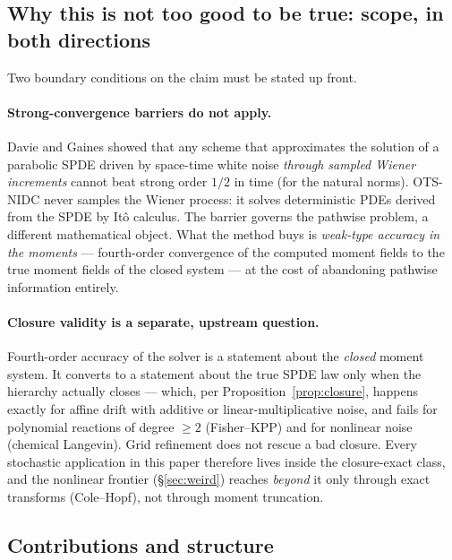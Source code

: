 \subsection{Why this is not too good to be true: scope, in both directions}

Two boundary conditions on the claim must be stated up front.

\paragraph{Strong-convergence barriers do not apply.} Davie and Gaines
\citep{davie2001} showed that any scheme that approximates the solution of a
parabolic SPDE driven by space-time white noise \emph{through sampled Wiener
increments} cannot beat strong order $1/2$ in time (for the natural norms).
OTS-NIDC never samples the Wiener process: it solves deterministic PDEs derived
from the SPDE by It\^o calculus. The barrier governs the pathwise problem, a
different mathematical object. What the method buys is \emph{weak-type accuracy in
the moments} --- fourth-order convergence of the computed moment fields to the
true moment fields of the closed system --- at the cost of abandoning pathwise
information entirely.

\paragraph{Closure validity is a separate, upstream question.} Fourth-order
accuracy of the solver is a statement about the \emph{closed} moment system. It
converts to a statement about the true SPDE law only when the hierarchy actually
closes --- which, per Proposition~\ref{prop:closure}, happens exactly for affine
drift with additive or linear-multiplicative noise, and fails for polynomial
reactions of degree $\ge 2$ (Fisher--KPP) and for nonlinear noise (chemical
Langevin). Grid refinement does not rescue a bad closure. Every stochastic
application in this paper therefore lives inside the closure-exact class, and the
nonlinear frontier (\S\ref{sec:weird}) reaches \emph{beyond} it only through exact
transforms (Cole--Hopf), not through moment truncation.

\subsection{Contributions and structure}

